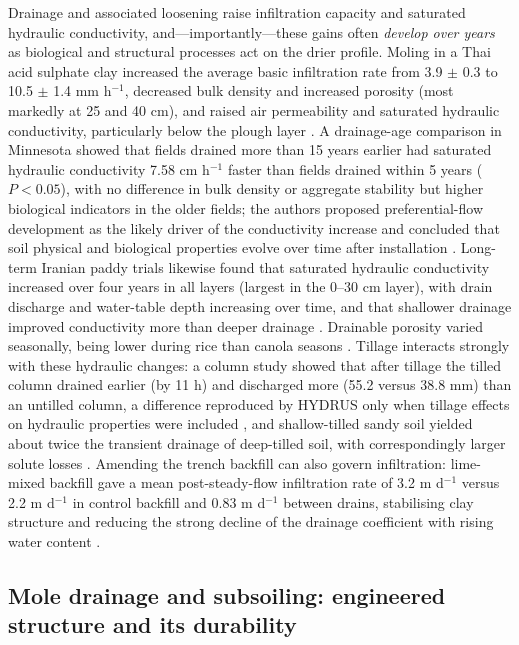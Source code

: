 \documentclass[11pt]{article}
\begin{document}
Drainage and associated loosening raise infiltration capacity and saturated hydraulic
conductivity, and---importantly---these gains often \emph{develop over years} as
biological and structural processes act on the drier profile. Moling in a Thai acid
sulphate clay increased the average basic infiltration rate from 3.9 $\pm$ 0.3 to
10.5 $\pm$ 1.4 mm h$^{-1}$, decreased bulk density and increased porosity (most
markedly at 25 and 40 cm), and raised air permeability and saturated hydraulic
conductivity, particularly below the plough layer \parencite{JHA1995}. A drainage-age
comparison in Minnesota showed that fields drained more than 15 years earlier had
saturated hydraulic conductivity 7.58 cm h$^{-1}$ faster than fields drained within 5
years ($P < 0.05$), with no difference in bulk density or aggregate stability but
higher biological indicators in the older fields; the authors proposed
preferential-flow development as the likely driver of the conductivity increase and
concluded that soil physical and biological properties evolve over time after
installation \parencite{Frankl2023}. Long-term Iranian paddy trials likewise found
that saturated hydraulic conductivity increased over four years in all layers (largest
in the 0--30 cm layer), with drain discharge and water-table depth increasing over
time, and that shallower drainage improved conductivity more than deeper drainage
\parencite{JafariTalukolaee2016,Talukolaee2018}. Drainable porosity varied seasonally,
being lower during rice than canola seasons \parencite{Talukolaee2018}. Tillage
interacts strongly with these hydraulic changes: a column study showed that after
tillage the tilled column drained earlier (by 11 h) and discharged more (55.2 versus
38.8 mm) than an untilled column, a difference reproduced by HYDRUS only when
tillage effects on hydraulic properties were included \parencite{Moroizumi2004}, and
shallow-tilled sandy soil yielded about twice the transient drainage of deep-tilled
soil, with correspondingly larger solute losses \parencite{MANSELL1980}. Amending the
trench backfill can also govern infiltration: lime-mixed backfill gave a mean
post-steady-flow infiltration rate of 3.2 m d$^{-1}$ versus 2.2 m d$^{-1}$ in control
backfill and 0.83 m d$^{-1}$ between drains, stabilising clay structure and reducing
the strong decline of the drainage coefficient with rising water content
\parencite{Saulys2006}.

\subsection{Mole drainage and subsoiling: engineered structure and its durability}
\end{document}

